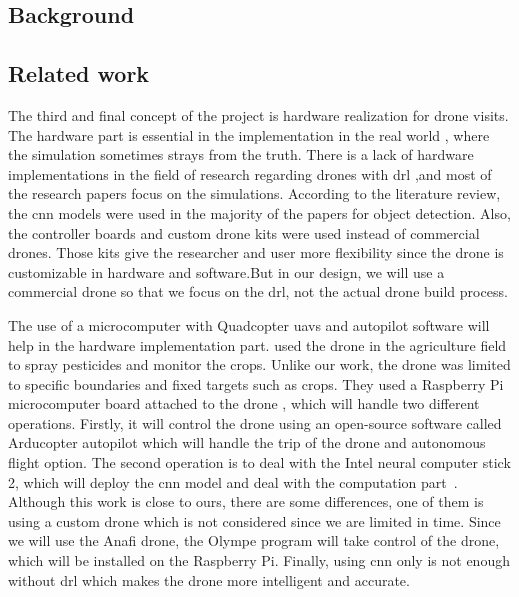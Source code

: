 \documentclass[../main.tex]{subfiles}
\begin{document}
\subsection{Background}

\blindtext

\subsection{Related work}


		The third and final concept of the project is hardware realization for drone visits.
		The hardware part is essential in the implementation in the real world
		, where the simulation sometimes strays from the truth.
		There is a lack of hardware implementations in the field of research regarding drones with \gls{drl}
		 ,and most of the research papers focus on the simulations.
		According to the literature review, 
		the \gls{cnn} models were used in the majority of the papers for object detection. 
		Also, the controller boards and custom drone kits were used instead of commercial drones.
		Those kits give the researcher and user more flexibility since the drone is customizable 
		in hardware and software.But in our design, we will use a commercial drone so that we focus
		 on the \gls{drl}, not the actual drone build process. 


	The use of a microcomputer with Quadcopter \glspl{uav} and autopilot software will help in the hardware implementation part.
	\citeauthor{Khan21} used the drone in the agriculture field to spray 
	pesticides and monitor the crops. Unlike our work, the drone was limited to specific
	boundaries and fixed targets such as crops.
	They used a Raspberry Pi microcomputer board attached to the drone
	, which will handle two different operations. Firstly, it will control the drone using an open-source
	 software called Arducopter autopilot which will handle the trip of the drone and autonomous 
	 flight option. The second operation is to deal with the Intel neural computer stick 2, 
	 which will deploy the \gls{cnn} model and deal with the computation part~\cite{Khan21}.
	Although this work is close to ours, there are some differences, 
	one of them is using a custom drone which is not considered since we are limited in time.
	Since we will use the Anafi drone, the Olympe program will take control of the drone, which will
	 be installed on the Raspberry Pi. Finally, using \gls{cnn} only is not enough without \gls{drl} 
	 which makes the drone more intelligent and accurate.
\end{document}
